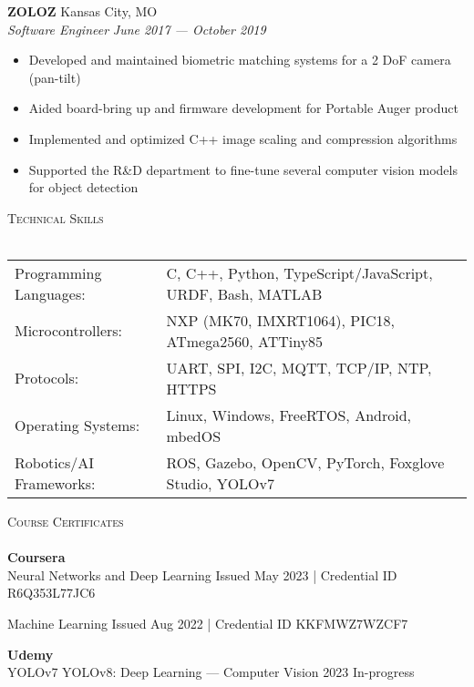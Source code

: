 \documentclass[a4paper]{article}
\newcommand{\lineunder} {
    \vspace*{-8pt} \\
    \hspace*{-18pt} \hrulefill \\
}
\newcommand{\header} [1] {
    {\hspace*{-18pt}\vspace*{6pt} \textsc{#1}}
    \vspace*{-6pt} \lineunder
}
\begin{document}
\textbf{ZOLOZ} \hfill Kansas City, MO\\
\textit{Software Engineer} \hfill \textit{June 2017 --- October 2019}\\
\vspace{-1mm}
\begin{itemize} \itemsep 1pt
	\item Developed and maintained biometric matching systems for a 2 DoF camera (pan-tilt)
	\item Aided board-bring up and firmware development for Portable Auger product
	\item Implemented and optimized C++ image scaling and compression algorithms
	\item Supported the R\&D department to fine-tune several computer vision models for object detection
\end{itemize}

\header{Technical Skills}
\vspace{2mm}
\begin{tabular}{ l l }
	Programming Languages: & C, C++, Python, TypeScript/JavaScript, URDF, Bash, MATLAB \\
    Microcontrollers:      & NXP (MK70, IMXRT1064), PIC18, ATmega2560, ATTiny85        \\
    Protocols:             & UART, SPI, I2C, MQTT, TCP/IP, NTP, HTTPS \\
    Operating Systems:     & Linux, Windows, FreeRTOS, Android, mbedOS \\
    Robotics/AI Frameworks:   & ROS, Gazebo, OpenCV, PyTorch, Foxglove Studio, YOLOv7 \\
\end{tabular}
\vspace{5mm}

\header{Course Certificates}
{\textbf{Coursera}}\\
\vspace{1.75mm}
Neural Networks and Deep Learning \hfill Issued May 2023 | \footnotesize{Credential ID R6Q353L77JC6}

\normalsize{}

\vspace{1mm}
Machine Learning \hfill Issued Aug 2022 | \footnotesize{Credential ID KKFMWZ7WZCF7}

\vspace{2mm}

\normalsize{}

{\textbf{Udemy}}\\
\vspace{1mm}
YOLOv7 YOLOv8: Deep Learning --- Computer Vision 2023 \hfill In-progress
\end{document}
